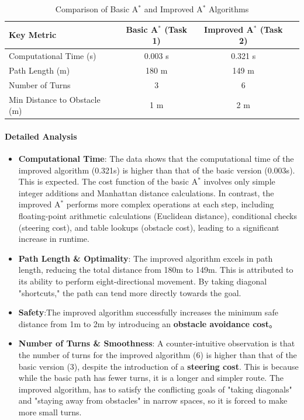 \documentclass[aps,letterpaper,10pt]{revtex4}
\begin{document}
\begin{table}[h!]
    \centering
    \caption{Comparison of Basic A$^*$ and Improved A$^*$ Algorithms}
    \label{tab:comparison}
    \begin{tabular}{|l|c|c|p{4cm}|}
        \hline
        \textbf{Key Metric} & \textbf{Basic A$^*$ (Task 1)} & \textbf{Improved A$^*$ (Task 2)}  \\
        \hline
        Computational Time (s) & 0.003 s & 0.321 s  \\
        \hline
        Path Length (m) & 180 m & 149 m  \\
        \hline
        Number of Turns & 3 & 6  \\
        \hline
        Min Distance to Obstacle (m) & 1 m &2 m \\
        \hline
    \end{tabular}
\end{table}

\paragraph{Detailed Analysis}
\begin{itemize}
    \item \textbf{Computational Time}: The data shows that the computational time of the improved algorithm (0.321s) is higher than that of the basic version (0.003s). This is expected. The cost function of the basic A$^*$ involves only simple integer additions and Manhattan distance calculations. In contrast, the improved A$^*$ performs more complex operations at each step, including floating-point arithmetic calculations (Euclidean distance), conditional checks (steering cost), and table lookups (obstacle cost), leading to a significant increase in runtime.

    \item \textbf{Path Length \& Optimality}: The improved algorithm excels in path length, reducing the total distance from 180m to 149m. This is attributed to its ability to perform eight-directional movement. By taking diagonal "shortcuts," the path can tend more directly towards the goal.

    \item \textbf{Safety}:The improved algorithm successfully increases the minimum safe distance from 1m to 2m by introducing an \textbf{obstacle avoidance cost}。
    \item \textbf{Number of Turns \& Smoothness}: A counter-intuitive observation is that the number of turns for the improved algorithm (6) is higher than that of the basic version (3), despite the introduction of a \textbf{steering cost}. This is because while the basic path has fewer turns, it is a longer and simpler route. The improved algorithm, has to satisfy the conflicting goals of "taking diagonals" and "staying away from obstacles" in narrow spaces, so it is forced to make more small turns. 
\end{itemize}
\end{document}
